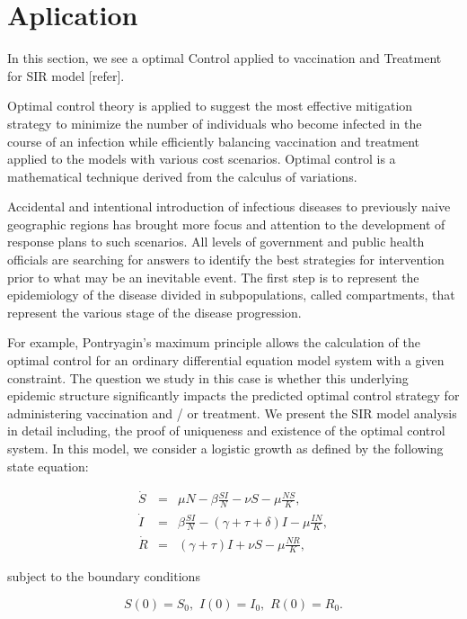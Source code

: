 \section{Aplication}

In this section, we see a optimal Control applied to vaccination and Treatment 
for SIR model [refer].

Optimal control theory is applied to suggest the most effective mitigation 
strategy to minimize the number of individuals who become infected in the 
course of an infection while efficiently balancing vaccination and treatment 
applied to the models with various cost scenarios. Optimal control is a  
mathematical technique derived from the calculus of variations.

    Accidental and intentional introduction of infectious diseases  to 
previously naive geographic regions has brought more focus and attention to 
the development of response plans to such scenarios.
All levels of government and public health officials are searching for answers 
to identify the best strategies for intervention prior to what may be an 
inevitable event.
The first step is to represent the epidemiology of the disease divided in 
subpopulations, called compartments, that represent the various stage of the 
disease progression.

For example, Pontryagin’s maximum principle allows the calculation of the 
optimal control for an ordinary differential equation model system with a given 
constraint.
The question  we study in this case is whether this underlying epidemic 
structure significantly impacts the predicted optimal control strategy for 
administering vaccination and / or treatment.
%
We present the SIR model analysis in detail including, the proof of uniqueness 
and existence of the optimal control system. In this model, we consider a 
logistic growth as defined by the following state equation:

\begin{eqnarray}\label{eq.1.4.SIR}
\dot{S}  &=& \mu N-\beta\frac{SI}{N}-\nu S -\mu \frac{NS}{K}, \label{eq.1.4.1}  
\\
\dot{I}   &=& \beta\frac{SI}{N} - (\gamma+\tau+\delta) I -\mu \frac{IN}{K}, 
\label{eq.1.4.2} \\
\dot{R} &=& (\gamma+\tau) I+\nu S - \mu \frac{NR}{K},  \label{eq.1.4.3}
\end{eqnarray}

subject to the boundary conditions

\begin{equation}\label{eq.1.4.4}
S(0)=S_0,\,\, I(0)=I_0,\,\, R(0)=R_0.
\end{equation}

